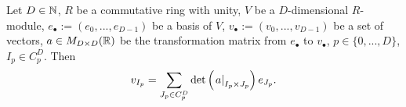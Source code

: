 \begin{proposition}
  Let
    $D \in \mathbb{N}$,
    $R$ be a commutative ring with unity,
    $V$ be a $D$-dimensional $R$-module,
    $e_\bullet := (e_0, ..., e_{D - 1})$ be a basis of $V$,
    $v_\bullet := (v_0, ..., v_{D - 1})$ be a set of vectors,
    $a \in M_{D \times D}(\mathbb{R})$ be the transformation matrix from
      $e_\bullet$ to $v_\bullet$,
    $p \in \{0, ..., D\}$,
    $I_p \in C^D_p$.
  Then
  \begin{equation}
    v_{I_p} =
    \sum_{J_p \in C^D_p} \det \left(\left. a \right|_{I_p \times J_p}\right) e_{J_p}.
  \end{equation}
\end{proposition}
